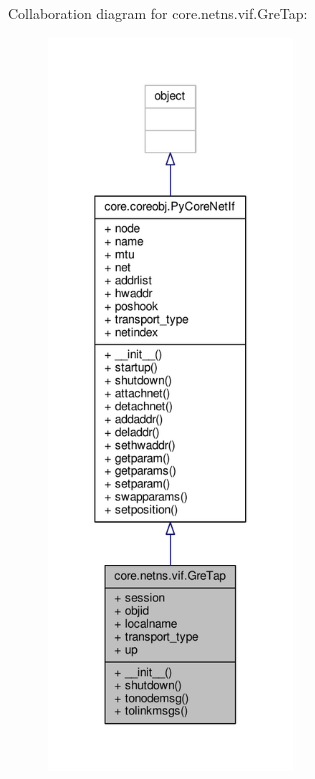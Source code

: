 Collaboration diagram for core.\+netns.\+vif.\+Gre\+Tap\+:
\nopagebreak
\begin{figure}[H]
\begin{center}
\leavevmode
\includegraphics[height=550pt]{classcore_1_1netns_1_1vif_1_1_gre_tap__coll__graph}
\end{center}
\end{figure}
